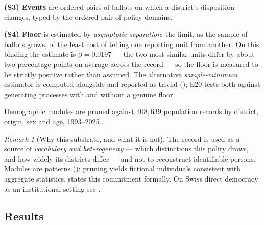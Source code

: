 \documentclass[11pt,a4paper]{article}
\theoremstyle{clstyle}
\theoremstyle{definition}
\theoremstyle{remark}
\newtheorem{remark}[theorem]{Remark}
\newcommand{\flo}{\beta}
\begin{document}
\textbf{(S3) Events} are ordered pairs of ballots on which a district's
disposition changes, typed by the ordered pair of policy domains.

\textbf{(S4) Floor} is estimated by \emph{asymptotic separation}: the limit,
as the sample of ballots grows, of the least cost of telling one reporting
unit from another. On this binding the estimate is
$\flo=0.0197$ --- the two most similar units differ by about two percentage
points on average across the record --- so the floor is measured to be
strictly positive rather than assumed. The alternative
\emph{sample-minimum} estimator is computed alongside and reported as trivial
(); E20 tests both against generating processes
with and without a genuine floor.

Demographic modules are pruned against $408{,}639$ population records by
district, origin, sex and age, 1993--2025 \citep{ssz_bevoelkerung}.

\begin{remark}[Why this substrate, and what it is not]
\label{rem:why-zurich}
The record is used as a source of \emph{vocabulary and heterogeneity} ---
which distinctions this polity draws, and how widely its districts differ ---
and not to reconstruct identifiable persons. Modules are patterns
(); pruning yields fictional individuals consistent with
aggregate statistics.  states this commitment formally. On
Swiss direct democracy as an institutional setting see
\citet{kriesi2008direct,funk2011voter,feld2001nonvoter}.
\end{remark}

\subsection{Results}
\end{document}
